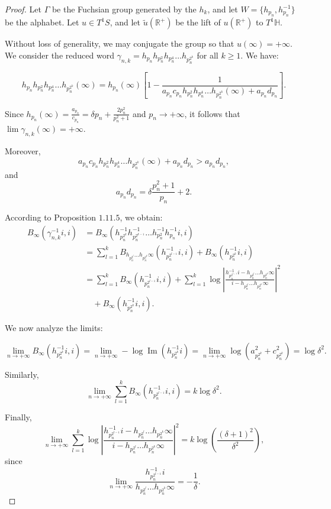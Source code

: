 \documentclass[11pt]{amsart}
\begin{document}
\begin{proof}
Let $\Gamma$ be the Fuchsian group generated by the $h_k$, and let $W = \{h_{p_n}, h_{p_n}^{-1}\}$ be the alphabet. Let $u \in T^1 S$, and let $\tilde{u}(\mathbb{R}^+)$ be the lift of $u(\mathbb{R}^+)$ to $T^1 \mathbb{H}$.  

Without loss of generality, we may conjugate the group so that $u(\infty) = +\infty$.  
We consider the reduced word $\gamma_{n,k} = h_{p_n} h_{p_n^2} h_{p_n^4} \ldots h_{p_n^{2^k}}$ for all $k \geq 1$. We have:

\[
h_{p_n} h_{p_n^2} h_{p_n^4} \ldots h_{p_n^{2^k}}(\infty) = h_{p_n}(\infty) \left[1 - \frac{1}{a_{p_n} c_{p_n} h_{p_n^2} h_{p_n^4} \ldots h_{p_n^{2^k}}(\infty) + a_{p_n} d_{p_n}}\right].
\]

Since $h_{p_n}(\infty) = \frac{a_{p_n}}{c_{p_n}} = \delta p_n + \frac{2p_n^2}{p_n^2 + 1}$ and $p_n \to +\infty$, it follows that $\lim \gamma_{n,k}(\infty) = +\infty$.  

Moreover, 
\[
a_{p_n} c_{p_n} h_{p_n^2} h_{p_n^4} \ldots h_{p_n^{2^k}}(\infty) + a_{p_n} d_{p_n} > a_{p_n} d_{p_n},
\]
and 
\[
a_{p_n} d_{p_n} = \delta \frac{p_n^2 + 1}{p_n} + 2.
\]

According to Proposition $1.11.5$, we obtain:
\begin{align*}
B_{\infty}(\gamma_{n,k}^{-1}i, i) &= B_{\infty}(h_{p_n^{2^k}}^{-1} h_{p_n^{2^{k-1}}}^{-1} \ldots h_{p_n^2}^{-1} h_{p_n}^{-1}i, i) \\
&= \sum_{l=1}^{k} B_{h_{p_n^{2^l}} \ldots h_{p_n^{2^k}}\infty}(h_{p_n^{2^{l-1}}}^{-1}i, i) + B_{\infty}(h_{p_n^{2^k}}^{-1}i, i) \\
&= \sum_{l=1}^{k} B_{\infty}(h_{p_n^{2^{l-1}}}^{-1}i, i) + \sum_{l=1}^{k} \log \left|\frac{h_{p_n^{2^{l-1}}}^{-1}i - h_{p_n^{2^l}} \ldots h_{p_n^{2^k}}\infty}{i - h_{p_n^{2^l}} \ldots h_{p_n^{2^k}}\infty}\right|^2 \\
&\quad + B_{\infty}(h_{p_n^{2^k}}^{-1}i, i).
\end{align*}

We now analyze the limits:

\[
\lim_{n \to +\infty} B_{\infty}(h_{p_n^{2^k}}^{-1}i, i) = \lim_{n \to +\infty} -\log \operatorname{Im}(h_{p_n^{2^k}}^{-1}i) = \lim_{n \to +\infty} \log(a_{p_n^{2^k}}^2 + c_{p_n^{2^k}}^2) = \log \delta^2.
\]

Similarly,
\[
\lim_{n \to +\infty} \sum_{l=1}^{k} B_{\infty}(h_{p_n^{2^{l-1}}}^{-1}i, i) = k \log \delta^2.
\]

Finally,
\[
\lim_{n \to +\infty} \sum_{l=1}^{k} \log \left|\frac{h_{p_n^{2^{l-1}}}^{-1}i - h_{p_n^{2^l}} \ldots h_{p_n^{2^k}}\infty}{i - h_{p_n^{2^l}} \ldots h_{p_n^{2^k}}\infty}\right|^2 = k \log\left(\frac{(\delta + 1)^2}{\delta^2}\right),
\]
since
\[
\lim_{n \to +\infty} \frac{h_{p_n^{2^{l-1}}}^{-1}i}{h_{p_n^{2^l}} \ldots h_{p_n^{2^k}}\infty} = -\frac{1}{\delta}.
\]


\end{proof}
\end{document}

